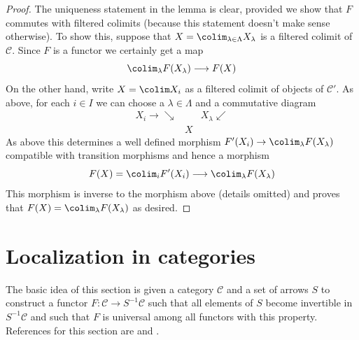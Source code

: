 \begin{proof}
\medskip\noindent
The uniqueness statement in the lemma is clear, provided
we show that $F$ commutes with filtered colimits (because this
statement doesn't make sense otherwise). To show this, suppose that
$X = \colim_{\lambda \in \Lambda} X_\lambda$
is a filtered colimit of $\mathcal{C}$. Since $F$ is a functor
we certainly get a map
$$
\colim_\lambda F(X_\lambda) \longrightarrow F(X)
$$
On the other hand, write $X = \colim X_i$
as a filtered colimit of objects of $\mathcal{C}'$.
As above, for each $i \in I$ we can choose a $\lambda \in \Lambda$
and a commutative diagram
$$
\begin{array}{ccc}X_i \longrightarrow\searrow &  & X_\lambda \swarrow \\  & X & \end{array}
$$
As above this determines a well defined morphism
$F'(X_i) \to \colim_\lambda F(X_\lambda)$ compatible
with transition morphisms and hence a morphism
$$
F(X) = \colim_i F'(X_i) \longrightarrow \colim_\lambda F(X_\lambda)
$$
This morphism is inverse to the morphism above (details omitted)
and proves that $F(X) = \colim_\lambda F(X_\lambda)$ as desired.
\end{proof}

\section{Localization in categories}
\label{categories-section-localization}
The basic idea of this section is given a category $\mathcal{C}$
and a set of arrows $S$ to construct a functor
$F : \mathcal{C} \to S^{-1}\mathcal{C}$
such that all elements of $S$ become invertible in $S^{-1}\mathcal{C}$
and such that $F$ is universal among all functors with this property.
References for this section are \cite[Chapter I, Section 2]{GZ}
and \cite[Chapter II, Section 2]{Verdier}.

